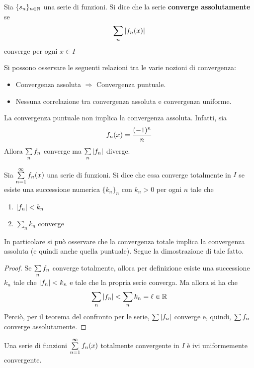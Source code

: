 \begin{definition}
    Sia $\{s_n\}_{n \in \mathbb{N}}$ una serie di funzioni. Si dice che la serie \textbf{converge assolutamente}  se
    \begin{equation}
        \sum_{n}{|f_n(x)|}
    \end{equation}
    converge per ogni $x \in I$
\end{definition}
Si possono osservare le seguenti relazioni tra le varie nozioni di convergenza:
\begin{itemize}
    \item Convergenza assoluta $\Rightarrow$ Convergenza puntuale.
    \item  Nessuna correlazione tra convergenza assoluta e convergenza uniforme.
\end{itemize}
\begin{example}
    La convergenza puntuale non implica la convergenza assoluta. Infatti, sia
    \begin{equation*}
        f_n(x)=\frac{(-1)^n}{n}
    \end{equation*}
    Allora $\sum\limits_{n}{f_n}$ converge ma $\sum\limits_{n}{|f_n|}$ diverge.
\end{example}
\begin{definition}
    Sia $\sum\limits_{n=1}^{\infty}{f_n(x)}$ una serie di funzioni. Si dice che essa converge totalmente in $I$ se esiste una successione numerica $\{k_n\}_n$ con $k_n>0$ per ogni $n$ tale che
    \begin{enumerate}
        \item $|f_n|<k_n$
        \item $\sum\limits_{n}{k_n}$ converge
    \end{enumerate}
\end{definition}
In particolare si può osservare che la convergenza totale implica la convergenza assoluta (e quindi anche quella puntuale). Segue la dimostrazione di tale fatto.
\begin{proof}
    Se $\sum\limits_{n}f_n$ converge totalmente, allora per definizione esiste una successione $k_n$ tale che $|f_n|<k_n$ e tale che la propria serie converga. Ma allora si ha che
    \begin{equation}
        \sum_{n}{|f_n|} < \sum_{n}{k_n}= \ell \in \mathbb{R}
    \end{equation}
    Perciò, per il teorema del confronto per le serie, $\sum\limits{|f_n|}$ converge e, quindi, $\sum\limits{f_n}$ converge assolutamente.
\end{proof}
\begin{theorem} \label{Teo: Criterio di Weierstrass (convergenza totale)}
Una serie di funzioni $\sum\limits_{n=1}^{\infty}{f_n(x)}$ totalmente convergente in $I$ è ivi uniformemente convergente.
\end{theorem}
